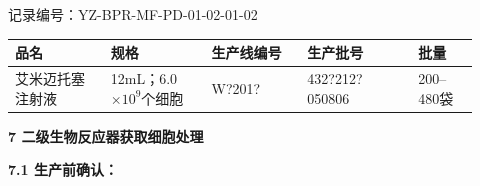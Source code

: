 \documentclass[UTF8,10pt,a4paper,fontset=fandol]{ctexart}
\newcommand{\fieldvalue}[1]{#1}
\newcommand{\handwritten}[1]{#1}
\begin{document}
\noindent
记录编号：YZ-BPR-MF-PD-01-02-01-02

\begin{center}
\begin{tabular}{|p{0.19\linewidth}|p{0.20\linewidth}|p{0.19\linewidth}|p{0.22\linewidth}|p{0.12\linewidth}|}
\hline
品名 & 规格 & 生产线编号 & 生产批号 & 批量 \\ \hline
艾米迈托塞注射液 & 12mL；6.0$\times 10^{9}$个细胞 &
\fieldvalue{\handwritten{W?201?}} &
\fieldvalue{\handwritten{432?212?050806}} &
200--480袋 \\ \hline
\end{tabular}
\end{center}

\noindent
\textbf{7 二级生物反应器获取细胞处理}

\noindent
\textbf{7.1 生产前确认：}
\end{document}
